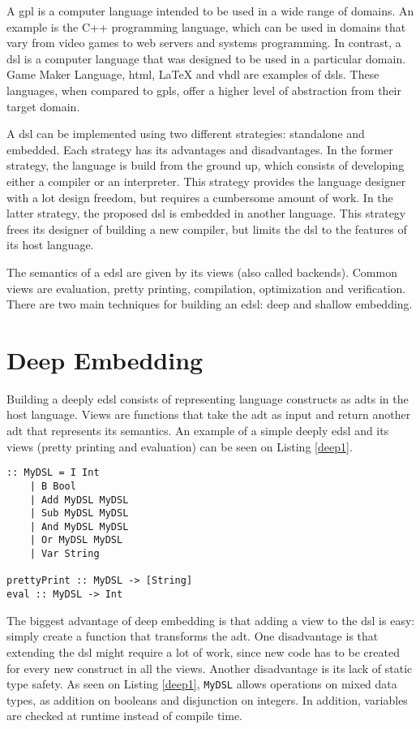 A \ac{gpl} is a computer language intended to be used in a wide range of domains. An example is the C++ programming language, which can be used in domains that vary from video games to web servers and systems programming. In contrast, a \ac{dsl} is a computer language that was designed to be used in a particular domain. Game Maker Language, \acs{html}, LaTeX and \acs{vhdl} are examples of \acp{dsl}. These languages, when compared to \acp{gpl}, offer a higher level of abstraction from their target domain.

A \ac{dsl} can be implemented using two different strategies: standalone and embedded. Each strategy has its advantages and disadvantages. In the former strategy, the language is build from the ground up, which consists of developing either a compiler or an interpreter. This strategy provides the language designer with a lot design freedom, but requires a cumbersome amount of work. In the latter strategy, the proposed \ac{dsl} is embedded in another language. This strategy frees its designer of building a new compiler, but limits the \ac{dsl} to the features of its host language.

The semantics of a \ac{edsl} are given by its views (also called backends). Common views are evaluation, pretty printing, compilation, optimization and verification. There are two main techniques for building an \ac{edsl}: deep and shallow embedding.

\section{Deep Embedding}

Building a deeply \ac{edsl} consists of representing language constructs as \acp{adt} in the host language. Views are functions that take the \ac{adt} as input and return another \ac{adt} that represents its semantics. An example of a simple deeply \ac{edsl} and its views (pretty printing and evaluation) can be seen on Listing \ref{deep1}.


\begin{lstlisting}[caption=A simple deeply \ac{edsl} and its views,captionpos=b,label=deep1]
:: MyDSL = I Int
    | B Bool
    | Add MyDSL MyDSL
    | Sub MyDSL MyDSL
    | And MyDSL MyDSL
    | Or MyDSL MyDSL
    | Var String
    
prettyPrint :: MyDSL -> [String]
eval :: MyDSL -> Int
\end{lstlisting}

The biggest advantage of deep embedding is that adding a view to the \ac{dsl} is easy: simply create a function that transforms the \ac{adt}. One disadvantage is that extending the \ac{dsl} might require a lot of work, since new code has to be created for every new construct in all the views. Another disadvantage is its lack of static type safety. As seen on Listing \ref{deep1}, \texttt{MyDSL} allows operations on mixed data types, as addition on booleans and disjunction on integers. In addition, variables are checked at runtime instead of compile time.

